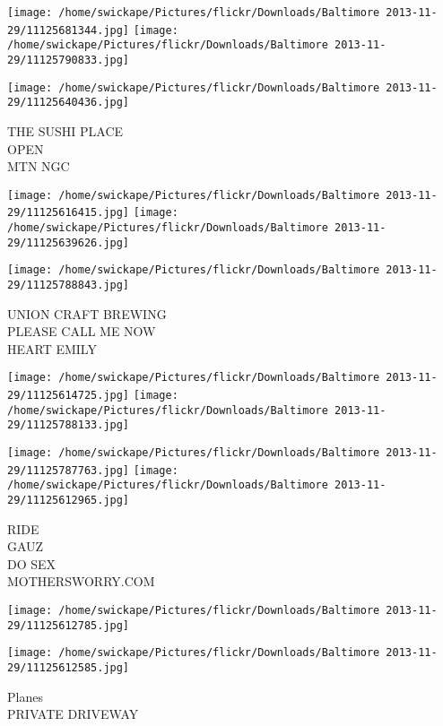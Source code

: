 \documentclass[10pt,letterpaper]{article}
\begin{document}
\texttt{[image: /home/swickape/Pictures/flickr/Downloads/Baltimore 2013-11-29/11125681344.jpg]}
\texttt{[image: /home/swickape/Pictures/flickr/Downloads/Baltimore 2013-11-29/11125790833.jpg]}

\vspace{0.25in}
\texttt{[image: /home/swickape/Pictures/flickr/Downloads/Baltimore 2013-11-29/11125640436.jpg]}

THE SUSHI PLACE\\
OPEN\\
MTN NGC\\
\pagebreak

\texttt{[image: /home/swickape/Pictures/flickr/Downloads/Baltimore 2013-11-29/11125616415.jpg]}
\texttt{[image: /home/swickape/Pictures/flickr/Downloads/Baltimore 2013-11-29/11125639626.jpg]}

\vspace{0.25in}
\texttt{[image: /home/swickape/Pictures/flickr/Downloads/Baltimore 2013-11-29/11125788843.jpg]}

UNION CRAFT BREWING\\
PLEASE CALL ME NOW\\
HEART EMILY\\
\pagebreak

\texttt{[image: /home/swickape/Pictures/flickr/Downloads/Baltimore 2013-11-29/11125614725.jpg]}
\texttt{[image: /home/swickape/Pictures/flickr/Downloads/Baltimore 2013-11-29/11125788133.jpg]}

\texttt{[image: /home/swickape/Pictures/flickr/Downloads/Baltimore 2013-11-29/11125787763.jpg]}
\texttt{[image: /home/swickape/Pictures/flickr/Downloads/Baltimore 2013-11-29/11125612965.jpg]}

RIDE\\
GAUZ\\
DO SEX\\
MOTHERSWORRY.COM\\
\pagebreak

\texttt{[image: /home/swickape/Pictures/flickr/Downloads/Baltimore 2013-11-29/11125612785.jpg]}

\vspace{0.25in}
\texttt{[image: /home/swickape/Pictures/flickr/Downloads/Baltimore 2013-11-29/11125612585.jpg]}

Planes\\
PRIVATE DRIVEWAY\\
\pagebreak
\end{document}

